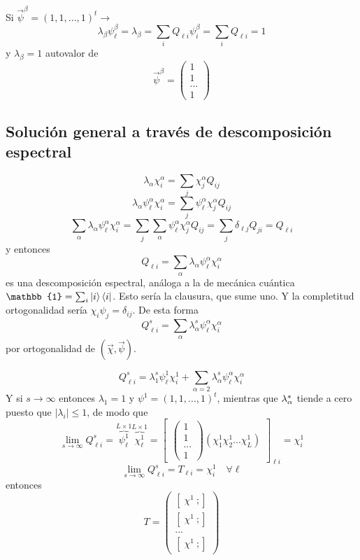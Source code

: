 \documentclass[10pt,oneside]{CBFT_book}
\begin{document}
Si $ \vec{\psi}^\beta = (1,1,...,1)^t\rightarrow$
\[
	\lambda_\beta \psi_\ell^\beta = \lambda_\beta = \sum_i Q_{\ell i} \psi_i^\beta
	= \sum_i Q_{\ell i} = 1
\]
y $\lambda_\beta=1$ autovalor de 
\[
	\vec{\psi}^\beta = \begin{pmatrix}
	 1\\
	 1\\
	 ...\\
	 1
	\end{pmatrix}
\]

\subsection{Solución general a través de descomposición espectral}

\[
	\lambda_\alpha \chi_i^\alpha = \sum_j \chi_j^\alpha Q_{ij} 
\]
\[
	\lambda_\alpha \psi_\ell^\alpha \chi_i^\alpha = \sum_j \psi_\ell^\alpha\chi_j^\alpha Q_{ij} 
\]
\[
	\sum_\alpha \lambda_\alpha \psi_\ell^\alpha \chi_i^\alpha = 
	\sum_j \sum_\alpha \psi_\ell^\alpha\chi_j^\alpha Q_{ij} =
	\sum_j \delta_{\ell j} Q_{ji} = Q_{\ell i}
\]
y entonces 
\[
	Q_{\ell i} = \sum_\alpha \lambda_\alpha \psi_\ell^\alpha \chi_i^\alpha
\]
es una descomposición espectral, análoga a la de mecánica cuántica $\mathbb{1} = \sum_i \Ket{i}\Bra{i}$.
Esto sería la clausura, que sume uno. Y la completitud ortogonalidad sería $\chi_i \psi_j = \delta_{ij}$.
De esta forma 
\[
	Q_{\ell i}^s = \sum_\alpha \lambda_\alpha^s \psi_\ell^\alpha \chi_i^\alpha
\]
por ortogonalidad de $( \vec{\chi}, \vec{\psi} )$.

\[
	Q_{\ell i}^s = \lambda_1^s \psi_\ell^1 \chi_i^1 + 
	\sum_{\alpha=2} \lambda_\alpha^s \psi_\ell^\alpha \chi_i^\alpha
\]
Y si $s \to \infty$ entonces $\lambda_1 = 1$ y $\psi^1 = (1,1,...,1)^t$, mientras que
$\lambda^s_{\alpha}$ tiende a cero puesto que $ |\lambda_i| \leq 1$, de modo que 
\[
	\lim_{s\to \infty} Q^s_{\ell i} = \overbrace{\psi_\ell^1}^{L\times 1} 
	\overbrace{\chi_\ell^1}^{L\times 1} = \begin{bmatrix}
	                                       \begin{pmatrix}
	                                        1 \\
	                                        1 \\ 
	                                        ... \\
	                                        1
	                                       \end{pmatrix}
						(\chi_1^1 \chi_2^1 ... \chi_L^1 )
	                                      \end{bmatrix}_{\ell i}
	= \chi_i^1
\]
\[
	\lim_{s\to \infty} Q^s_{\ell i} = T_{\ell i} = \chi_i^1 \quad \forall \ell
\]
entonces
\[
	T = \begin{pmatrix}
	     [ \; \chi^1 \ ; ] \\
	     [ \; \chi^1 \ ; ] \\
	     ...\\
	     [ \; \chi^1 \ ; ]
	    \end{pmatrix}
\]
\end{document}
